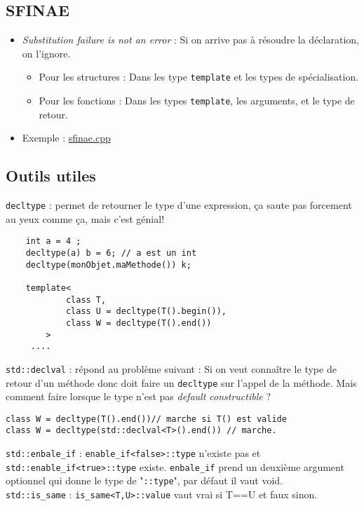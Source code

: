 \documentclass{beamer}
\begin{document}
\subsection{SFINAE}
\begin{frame}[containsverbatim]

	\begin{itemize}
		\item \emph{Substitution failure is not an error} : Si on arrive pas à résoudre la déclaration, on l'ignore.
		\begin{itemize}
			\item Pour les structures : Dans les type \lstinline{template} et les types de spécialisation.
			\item Pour les fonctions : Dans les types \lstinline{template}, les arguments, et le type de retour.
		\end{itemize}
		\item Exemple : \href{run:../code_demo/sfinae.cpp}{sfinae.cpp}
	\end{itemize}

	
\end{frame}

\subsection{Outils utiles}

\begin{frame}[containsverbatim]
\lstinline{decltype} : permet de retourner le type d'une expression, ça saute pas forcement au yeux comme ça, mais c'est génial!

\begin{lstlisting}
	int a = 4 ;
	decltype(a) b = 6; // a est un int
	decltype(monObjet.maMethode()) k; 

	template<
            class T,
            class U = decltype(T().begin()),
            class W = decltype(T().end())
        >
     .... 
\end{lstlisting}
\end{frame}

\begin{frame}[containsverbatim]
\lstinline{std::declval} : répond au problème suivant : Si on veut connaître le type de retour d'un méthode donc doit faire un \lstinline{decltype} sur l'appel de la méthode. Mais comment faire lorsque le type n'est pas \emph{default constructible} ? 
	\begin{lstlisting}
class W = decltype(T().end())// marche si T() est valide
class W = decltype(std::declval<T>().end()) // marche.
	\end{lstlisting}
	
\lstinline{std::enbale_if} : \lstinline{enable_if<false>::type} n'existe pas et \lstinline{std::enable_if<true>::type} existe. \lstinline{enbale_if} prend un deuxième argument optionnel qui donne le type de "\lstinline{::type}", par défaut il vaut void.
\\ 
\lstinline{std::is_same} : \lstinline{is_same<T,U>::value} vaut vrai si T==U et faux sinon.

\end{frame}
\end{document}

